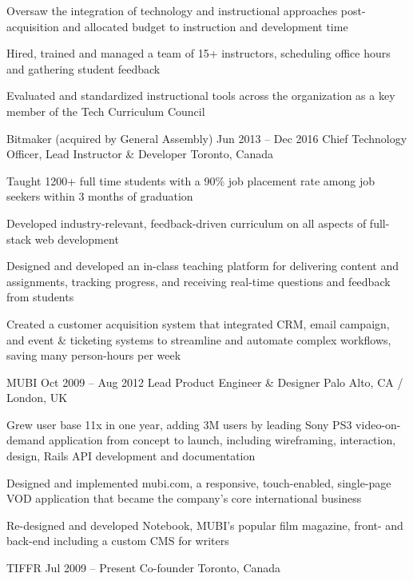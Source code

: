 \documentclass[10pt]{article}
\begin{document}
{{\begin{newitemize}
		\item {Oversaw the integration of technology and instructional approaches post-acquisition and allocated budget to instruction and development time}
		\item {Hired, trained and managed a team of 15+ instructors, scheduling office hours and gathering student feedback}
		\item {Evaluated and standardized instructional tools across the organization as a key member of the Tech Curriculum Council}
		\end{newitemize}}
	\pagebreak
	\job
	{Bitmaker (acquired by General Assembly)}
	{Jun 2013 – Dec 2016}
	{Chief Technology Officer, Lead Instructor \& Developer}
	{Toronto, Canada}
	{\begin{newitemize}
		\item {Taught 1200+ full time students with a 90\% job placement rate among job seekers within 3 months of graduation}
		\item {Developed industry-relevant, feedback-driven curriculum on all aspects of full-stack web development}
		\item {Designed and developed an in-class teaching platform for delivering content and assignments, tracking progress, and receiving real-time questions and feedback from students}
		\item {Created a customer acquisition system that integrated CRM, email campaign, and event \& ticketing systems to streamline and automate complex workflows, saving many person-hours per week}
		\end{newitemize}}
	\job
	{MUBI}
	{Oct 2009 – Aug 2012}
	{Lead Product Engineer \& Designer}
	{Palo Alto, CA / London, UK}
	{\begin{newitemize}
		\item {Grew user base 11x in one year, adding 3M users by leading Sony PS3 video-on-demand application from concept to launch, including wireframing, interaction, design, Rails API development and documentation}
		\item {Designed and implemented mubi.com, a responsive, touch-enabled, single-page VOD application that became the company’s core international business}
		\item {Re-designed and developed Notebook, MUBI’s popular film magazine, front- and back-end including a custom CMS for writers}
		\end{newitemize}}
	\job
	{TIFFR}
	{Jul 2009 – Present}
	{Co-founder}
	{Toronto, Canada}
	{\begin{newitemize}

\end{newitemize}}}
\end{document}
